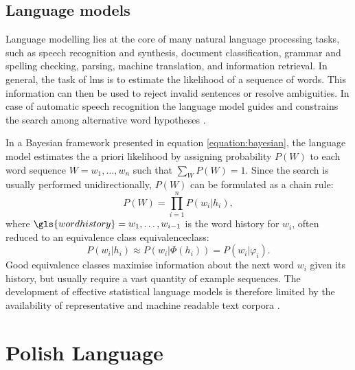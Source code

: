 \subsection{Language models}
\label{subsection:lm}
Language modelling lies at the core of many natural language processing tasks, such as speech recognition and synthesis, document classification, grammar and spelling checking, parsing, machine translation, and information retrieval. In general, the task of \glspl{lm} is to estimate the likelihood of a sequence of words. This information can then be used to reject invalid sentences or resolve ambiguities. In case of automatic speech recognition the language model guides and constrains the search among alternative word hypotheses \cite{glass2013automatic}.

In a Bayesian framework presented in equation \ref{equation:bayesian}, the language model estimates the a priori likelihood by assigning probability $P(W)$ to each word sequence $W=w_{1}, \ldots, w_{n}$ such that $\sum_{W}P(W)=1$. Since the search is usually performed unidirectionally, $P(W)$ can be formulated as a chain rule:
\begin{equation}
\label{equation:chain}
  P(W)=\prod^{n}_{i=1}P(w_{i}|h_{i}),
\end{equation}
where $\gls{wordhistory}=w_{1}, \ldots, w_{i-1}$ is the word history for $w_{i}$, often reduced to an equivalence class \gls{equivalenceclass}:
\begin{equation}
	P(w_{i}|h_{i})\approx P(w_{i}|\Phi(h_{i}))=P(w_{i}|\varphi_{i}).
\end{equation}
Good equivalence classes maximise information about the next word $w_{i}$ given its history, but usually require a vast quantity of example sequences. The development of effective statistical language models is therefore limited by the availability of representative and machine readable text corpora \cite{rosenfeld2000two}.

\section{Polish Language}
\label{section:polish}

